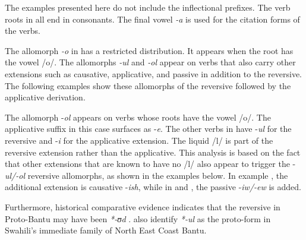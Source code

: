 \documentclass[output=paper]{langsci/langscibook}
\begin{document}
The examples presented here do not include the inflectional prefixes. The verb roots in  all end in consonants. The final vowel \textit{-a} is used for the citation forms of the verbs. 

The allomorph \textit{-o} in  has a restricted distribution. It appears when the root has the vowel /o/. The allomorphs \textit{-ul} and \textit{-ol} appear on verbs that also carry other extensions such as causative, applicative, and passive in addition to the reversive. The following examples show these allomorphs of the reversive followed by the applicative derivation.

\ea\label{ex:ngonyaningowa:4}
\ea\label{ex:ngonyaningowa:4a}
\ex\label{ex:ngonyaningowa:4b}
\ex\label{ex:ngonyaningowa:4c}
\ex\label{ex:ngonyaningowa:4d}
\ex\label{ex:ngonyaningowa:4e}
\z
\z

The allomorph -\textit{ol} appears on verbs whose roots have the vowel /o/. The applicative suffix in this case surfaces as -\textit{e}. The other verbs in  have -\textit{ul} for the reversive and -\textit{i} for the applicative extension. The liquid /l/ is part of the reversive extension rather than the applicative. This analysis is based on the fact that other extensions that are known to have no /l/ also appear to trigger the -\textit{ul/-ol} reversive allomorphs, as shown in the examples below. In example , the additional extension is causative -\textit{ish}, while in  and , the passive -\textit{iw/-ew} is added.

\ea\label{ex:ngonyaningowa:5}
\ea\label{ex:ngonyaningowa:5a}
\ex\label{ex:ngonyaningowa:5b}
\ex\label{ex:ngonyaningowa:5c}
\ex\label{ex:ngonyaningowa:5d}
\ex\label{ex:ngonyaningowa:5e}
\z
\z 

Furthermore, historical comparative evidence indicates that the reversive in Proto-Bantu may have been \textit{*-ʊd} \citep{Schadeberg2003,Meeussen1967}. \citet[370]{NurseHinnebusch1993} also identify \textit{*-ul} as the proto-form in Swahili’s immediate family of North East Coast Bantu. 
\end{document}
